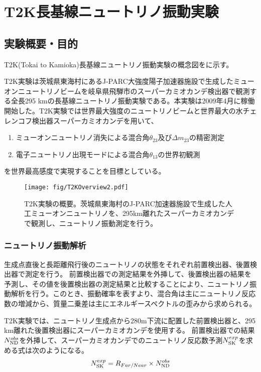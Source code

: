 \chapter{T2K長基線ニュートリノ振動実験}

\section{実験概要・目的}
T2K(Tokai to Kamioka)長基線ニュートリノ振動実験の概念図をに示す。

T2K実験\cite{jhfnu}は茨城県東海村にあるJ-PARC大強度陽子加速器施設で生成したミューオンニュートリノビームを岐阜県飛騨市のスーパーカミオカンデ検出器で観測する全長295 kmの長基線ニュートリノ振動実験である。本実験は2009年4月に稼働開始した。T2K実験では世界最大強度のニュートリノビームと世界最大の水チェレンコフ検出器スーパーカミオカンデを用いて、
\begin{enumerate}
\item ミューオンニュートリノ消失による混合角$\theta_{23}$及び$\Delta m_{23}$の精密測定
\item 電子ニュートリノ出現モードによる混合角$\theta_{13}$の世界初観測
\end{enumerate}
を世界最高感度で実現することを目標としている。

\begin{figure}[htbp]
\centering
\texttt{[image: fig/T2KOverview2.pdf]}
\caption[T2K実験の概要]{T2K実験の概要。茨城県東海村のJ-PARC加速器施設で生成した人工ミューオンニュートリノを、295km離れたスーパーカミオカンデで観測し、ニュートリノ振動測定を行う。}
\label{T2KOverview}
\end{figure}

\subsection{ニュートリノ振動解析}

生成点直後と長距離飛行後のニュートリノの状態をそれぞれ前置検出器、後置検出器で測定を行う。
前置検出器での測定結果を外挿して、後置検出器の結果を予測し、その値を後置検出器の測定結果と比較することにより、ニュートリノ振動解析を行う。このとき、振動確率を表すより、混合角は主にニュートリノ反応数の増減から、質量二乗差は主にエネルギースペクトルの歪みから求められる。

T2K実験では、ニュートリノ生成点から280m下流に配置した前置検出器と、295 km離れた後置検出器にスーパーカミオカンデを使用する。
前置検出器での結果$N_{\mathrm{ND}}^{obs}$を外挿して、スーパーカミオカンデでのニュートリノ反応数予測$N_{\mathrm{SK}}^{exp}$を求める式は次のようになる。
\begin{equation}
N_{\mathrm{SK}}^{exp}  =  R_{Far/Near} \times N_{\mathrm{ND}}^{obs}
\label{Extrapolation}
\end{equation}

